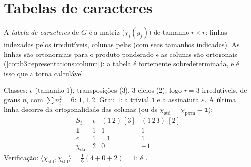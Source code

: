 \section{Tabelas de caracteres}

\begin{definition}\label{def:b3:representations:table}
A \emph{tabela de caracteres} de $G$ é
a matriz $\bigl(\chi_i(g_j)\bigr)$ de tamanho $r \times r$: linhas indexadas pelos 
irredutíveis, colunas pelas  (com seus tamanhos
indicados). As linhas são ortonormais para o produto ponderado e as
colunas são ortogonais (\cref{cor:b3:representations:column}): a tabela é fortemente
sobredeterminada, e é isso que a torna calculável.
\end{definition}

\begin{example}[A tabela de $S_3$]\label{ex:b3:representations:s3}
Classes: $e$ (tamanho 1), transposições (3), $3$-ciclos (2);
logo $r
= 3$ irredutíveis, de graus $n_i$ com $\sum n_i^2 = 6$: $1, 1,
2$. Grau
$1$: a trivial $\mathbf 1$ e a assinatura $\varepsilon$. A última linha decorre da
ortogonalidade das colunas (ou de $\chi_{\mathrm{std}} = \chi_{\mathrm{perm}} - \mathbf 1$):
\[
\begin{array}{c|ccc}
S_3 & e & (1\,2)\ [3] & (1\,2\,3)\ [2]\\
\hline
\mathbf 1 & 1 & 1 & 1\\
\varepsilon & 1 & -1 & 1\\
\chi_{\mathrm{std}} & 2 & 0 & -1
\end{array}
\]
Verificação: $\langle\chi_{\mathrm{std}},\chi_{\mathrm{std}}\rangle =
\frac{1}{6}(4 + 0 + 2) = 1$: é .
\end{example}

